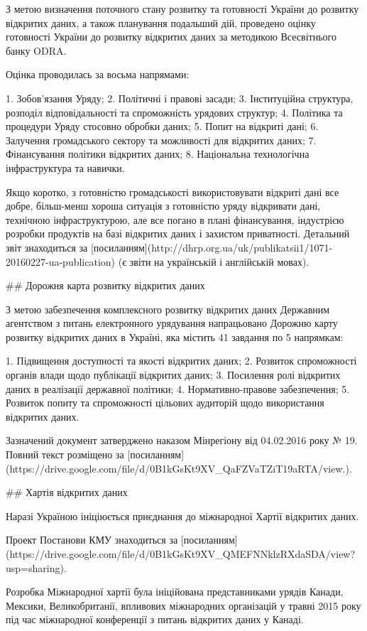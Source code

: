 З метою визначення поточного стану розвитку та готовності України до розвитку відкритих даних, а також планування подальший дій, проведено оцінку готовності України до розвитку відкритих даних за методикою Всесвітнього банку ODRA.

Оцінка проводилась за восьма напрямами:

1. Зобов'язання Уряду;
2. Політичні і правові засади;
3. Інституційна структура, розподіл відповідальності та спроможність урядових структур;
4. Політика та процедури Уряду стосовно обробки даних;
5. Попит на відкриті дані;
6. Залучення громадського сектору та можливості для відкритих даних;
7. Фінансування політики відкритих даних;
8. Національна технологічна інфраструктура та навички.

Якщо коротко, з готовністю громадськості використовувати відкриті дані все добре, більш-менш хороша ситуація з готовністю уряду відкривати дані, технічною інфраструктурою, але все погано в плані фінансування, індустрією розробки продуктів на базі відкритих даних і захистом приватності. Детальний звіт знаходиться за [посиланням](http://dhrp.org.ua/uk/publikatsii1/1071-20160227-ua-publication) (є звіти на українській і англійській мовах).

## Дорожня карта розвитку відкритих даних

З метою забезпечення комплексного розвитку відкритих даних Державним агентством з питань електронного урядування напрацьовано Дорожню карту розвитку відкритих даних в Україні, яка містить 41 завдання по 5 напрямкам:

1. Підвищення доступності та якості відкритих даних;
2. Розвиток спроможності органів влади щодо публікації відкритих даних;
3. Посилення ролі відкритих даних в реалізації державної політики;
4. Нормативно-правове забезпечення;
5. Розвиток попиту та спроможності цільових аудиторій щодо використання відкритих даних.

Зазначений документ затверджено наказом Мінрегіону від 04.02.2016 року № 19. Повний текст розміщено за [посиланням](https://drive.google.com/file/d/0B1kGsKt9XV_QaFZVaTZiT19aRTA/view.).

## Хартія відкритих даних

Наразі Україною ініціюється приєднання до міжнародної Хартії відкритих даних.

Проект Постанови КМУ знаходиться за [посиланням](https://drive.google.com/file/d/0B1kGsKt9XV_QMEFNNklzRXdaSDA/view?usp=sharing).

Розробка Міжнародної хартії була ініційована представниками урядів Канади, Мексики, Великобританії, впливових міжнародних організацій у травні 2015 року під час міжнародної конференції з питань відкритих даних у Канаді.

